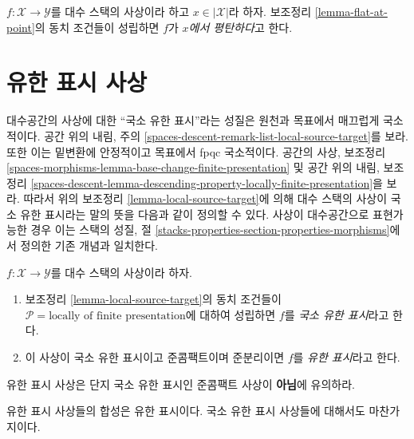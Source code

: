 \begin{definition}
\label{definition-flat-at-point}
$f : \mathcal{X} \to \mathcal{Y}$를 대수 스택의 사상이라 하고
$x \in |\mathcal{X}|$라 하자. 보조정리 \ref{lemma-flat-at-point}의
동치 조건들이 성립하면 $f$가 {\it $x$에서 평탄하다}고 한다.
\end{definition}





\section{유한 표시 사상}
\label{section-finite-presentation}

\noindent
대수공간의 사상에 대한 ``국소 유한 표시''라는 성질은 원천과 목표에서
매끄럽게 국소적이다. 공간 위의 내림, 주의
\ref{spaces-descent-remark-list-local-source-target}를 보라. 또한 이는
밑변환에 안정적이고 목표에서 fpqc 국소적이다. 공간의 사상, 보조정리
\ref{spaces-morphisms-lemma-base-change-finite-presentation} 및 공간 위의
내림, 보조정리
\ref{spaces-descent-lemma-descending-property-locally-finite-presentation}을
보라. 따라서 위의 보조정리 \ref{lemma-local-source-target}에 의해
대수 스택의 사상이 국소 유한 표시라는 말의 뜻을 다음과 같이 정의할 수
있다. 사상이 대수공간으로 표현가능한 경우 이는 스택의 성질, 절
\ref{stacks-properties-section-properties-morphisms}에서 정의한 기존
개념과 일치한다.

\begin{definition}
\label{definition-locally-finite-presentation}
$f : \mathcal{X} \to \mathcal{Y}$를 대수 스택의 사상이라 하자.
\begin{enumerate}
\item 보조정리 \ref{lemma-local-source-target}의 동치 조건들이
$\mathcal{P} = \text{locally of finite presentation}$에 대하여 성립하면
$f$를 {\it 국소 유한 표시}라고 한다.
\item 이 사상이 국소 유한 표시이고 준콤팩트이며 준분리이면 $f$를
{\it 유한 표시}라고 한다.
\end{enumerate}
\end{definition}

\noindent
유한 표시 사상은 단지 국소 유한 표시인 준콤팩트 사상이
{\bf 아님}에 유의하라.

\begin{lemma}
\label{lemma-composition-finite-presentation}
유한 표시 사상들의 합성은 유한 표시이다. 국소 유한 표시 사상들에
대해서도 마찬가지이다.
\end{lemma}

